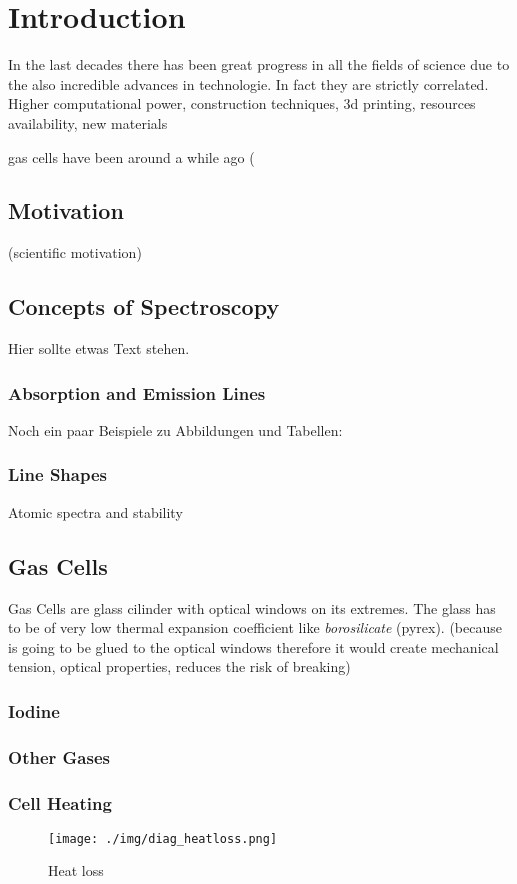 \documentclass[master,       %
               twoside,        %
               BCOR10mm,       %
               ngerman,english  %
               ]{GAUBM_astro}
\begin{document}
\mainmatter   %

\chapter{Introduction}
In the last decades there has been great progress in all the fields of science due to the also incredible advances in technologie.
In fact they are strictly correlated. Higher computational power, construction techniques, 3d printing, resources availability, new
materials

gas cells have been around a while ago (
\section{Motivation}
(scientific motivation)

\section{Concepts of Spectroscopy}
Hier sollte etwas Text stehen.
\subsection{Absorption and Emission Lines}
Noch ein paar Beispiele zu Abbildungen und Tabellen:
\subsection{Line Shapes}
Atomic spectra and stability
\section{Gas Cells}
Gas Cells are glass cilinder with optical windows on its extremes. The glass has to be of very low thermal 
expansion coefficient like \emph{borosilicate} (pyrex). (because is going to be glued to the optical windows therefore 
it would create mechanical tension, optical properties, reduces the risk of breaking)
\subsection{Iodine}
\subsection{Other Gases}
\subsection{Cell Heating}
\begin{center}
 \begin{figure}[h!]
 \centering
 \texttt{[image: ./img/diag\_heatloss.png]}
 \caption{Heat loss}
 \label{fig:diag_heatloss}
\end{figure}
\end{center}
\end{document}

